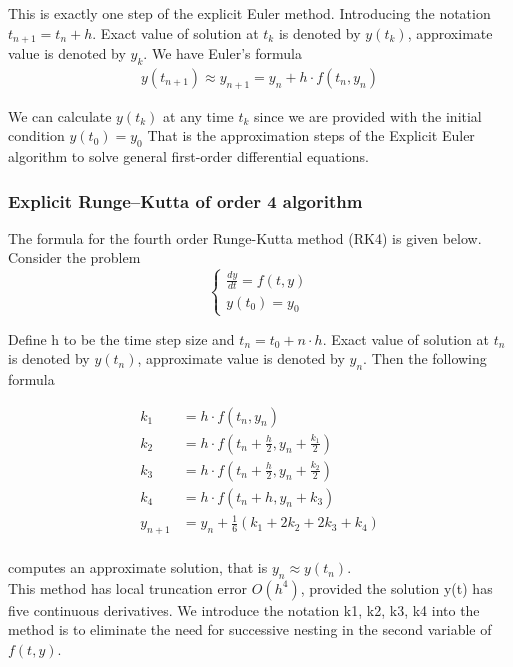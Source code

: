 \documentclass[a4paper]{article}
\numberwithin{equation}{section}
\begin{document}
This is exactly one step of the explicit Euler method. Introducing the notation \( t_{n+1} = t_n + h \). Exact value of solution at \(t_k\) is denoted by \(y(t_k)\), approximate value is denoted by \(y_k\). We have Euler’s formula
\begin{align*}
  y(t_{n+1}) \approx y_{n+1} = y_n + h \cdot f(t_n, y_n)
\end{align*}

We can calculate \(y(t_k)\) at any time \(t_k\) since we are provided with the initial condition \(y(t_0) = y_0\)
That is the approximation steps of the Explicit Euler algorithm to solve general first-order differential equations.


\subsubsection{Explicit Runge–Kutta of order 4 algorithm}
The formula for the fourth order Runge-Kutta method (RK4) is given below. Consider the problem
\begin{equation*}
  \begin{cases}
    \frac{dy}{dt} = f(t,y) \\
    y(t_0) = y_0
  \end{cases}
\end{equation*}

Define h to be the time step size and \(t_n = t_0 + n\cdot h\). Exact value of solution at \(t_n\) is denoted by \(y(t_n)\), approximate value is denoted by \(y_n\). Then the following formula

\begin{align*}
  k_1 & = h\cdot f(t_n, y_n)                                \\
  k_2 & = h\cdot f(t_n + \frac{h}{2}, y_n + \frac{k_1}{2}) \\
  k_3 & = h\cdot f(t_n + \frac{h}{2}, y_n + \frac{k_2}{2}) \\
  k_4 & = h\cdot f(t_n + h, y_n + k_3)\\
    y_{n+1} &= y_n + \frac{1}{6}(k_1 + 2k_2 + 2k_3 + k_4) \\
\end{align*}

computes an approximate solution, that is \(y_n \approx y(t_n)\).\\

This method has local truncation error \(O(h^4)\), provided the
solution y(t) has five continuous derivatives. We introduce the notation k1, k2, k3, k4 into
the method is to eliminate the need for successive nesting in the second variable of  \(f(t,y)\).
\end{document}
